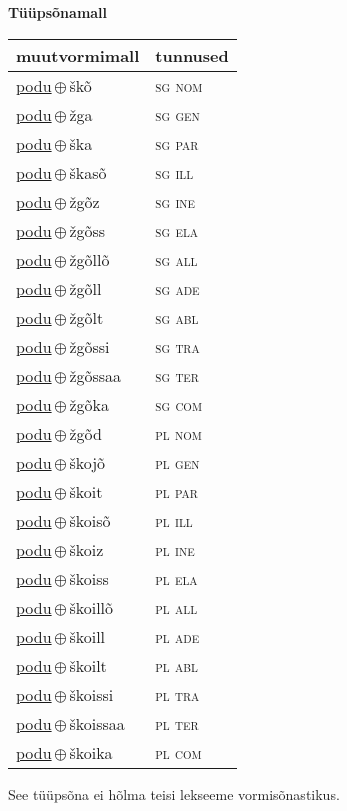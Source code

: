 

\vspace{3.5em}
\noindent \begin{minipage}{\textwidth}
\noindent \textbf{Tüüpsõnamall \,}\\

\begin{sideways}
\begin{tabular}{l l}
muutvormimall & tunnused \\
\hline
\underline{podu}\,$\oplus$\,škõ & \textsc{ sg nom } \\
\underline{podu}\,$\oplus$\,žga & \textsc{ sg gen } \\
\underline{podu}\,$\oplus$\,ška & \textsc{ sg par } \\
\underline{podu}\,$\oplus$\,škasõ & \textsc{ sg ill } \\
\underline{podu}\,$\oplus$\,žgõz & \textsc{ sg ine } \\
\underline{podu}\,$\oplus$\,žgõss & \textsc{ sg ela } \\
\underline{podu}\,$\oplus$\,žgõllõ & \textsc{ sg all } \\
\underline{podu}\,$\oplus$\,žgõll & \textsc{ sg ade } \\
\underline{podu}\,$\oplus$\,žgõlt & \textsc{ sg abl } \\
\underline{podu}\,$\oplus$\,žgõssi & \textsc{ sg tra } \\
\underline{podu}\,$\oplus$\,žgõssaa & \textsc{ sg ter } \\
\underline{podu}\,$\oplus$\,žgõka & \textsc{ sg com } \\
\underline{podu}\,$\oplus$\,žgõd & \textsc{ pl nom } \\
\underline{podu}\,$\oplus$\,škojõ & \textsc{ pl gen } \\
\underline{podu}\,$\oplus$\,škoit & \textsc{ pl par } \\
\underline{podu}\,$\oplus$\,škoisõ & \textsc{ pl ill } \\
\underline{podu}\,$\oplus$\,škoiz & \textsc{ pl ine } \\
\underline{podu}\,$\oplus$\,škoiss & \textsc{ pl ela } \\
\underline{podu}\,$\oplus$\,škoillõ & \textsc{ pl all } \\
\underline{podu}\,$\oplus$\,škoill & \textsc{ pl ade } \\
\underline{podu}\,$\oplus$\,škoilt & \textsc{ pl abl } \\
\underline{podu}\,$\oplus$\,škoissi & \textsc{ pl tra } \\
\underline{podu}\,$\oplus$\,škoissaa & \textsc{ pl ter } \\
\underline{podu}\,$\oplus$\,škoika & \textsc{ pl com } \\
\end{tabular}
\end{sideways}
\label{tab:tüüpsõnamall-poduškõ}

\end{minipage}

 
\vspace{1em}
\noindent See tüüpsõna ei hõlma teisi lekseeme vormi\-sõnastikus.
